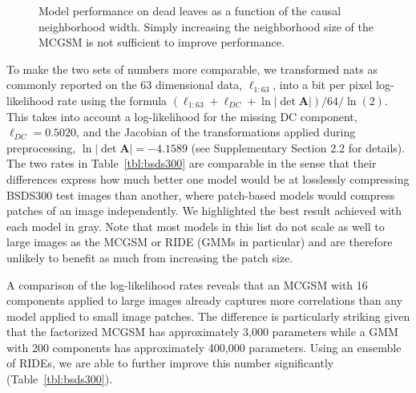 \documentclass{article}
\begin{document}
\begin{figure}[t]
\begin{floatrow}
{
 					\vspace{-.2cm}
				}{
					\caption{Model performance on dead leaves as a function of the causal
						neighborhood width. Simply increasing the neighborhood size of the MCGSM is not sufficient to
						improve performance.}
					\label{fig:nb_size}
				}
			\end{floatrow}
		\end{figure}

		To make the two sets of numbers more comparable, we transformed nats as commonly reported on the
		63 dimensional data, $\ell_{1:63}$, into a bit per pixel log-likelihood rate using the formula
		$(\ell_{1:63} + \ell_{DC} + \ln |\det \mathbf{A}|) / 64 / \ln(2)$. This takes into account a log-likelihood
		for the missing DC component, $\ell_{DC} = 0.5020$, and the Jacobian of the transformations applied during
		preprocessing, $\ln |\det \mathbf{A}| = -4.1589$ (see Supplementary Section
		2.2 for details). The two rates in Table~\ref{tbl:bsds300} are comparable in the sense that their differences express
		how much better one model would be at losslessly compressing BSDS300 test images than another, where patch-based models
		would compress patches of an image independently. We highlighted the best result
		achieved with each model in gray. Note that most models in this list do not scale as well to
		large images as the MCGSM or RIDE (GMMs in particular) and are therefore unlikely to benefit
		as much from increasing the patch size.

		A comparison of the log-likelihood rates reveals that an MCGSM with 16 components applied to
		large images already captures more correlations than any model applied to small image patches.
		The difference is particularly striking given that the factorized MCGSM has approximately 3,000
		parameters while a GMM with 200 components has approximately 400,000 parameters.
		Using an ensemble of RIDEs, we are able to further improve this number significantly
		(Table~\ref{tbl:bsds300}).
\end{document}
